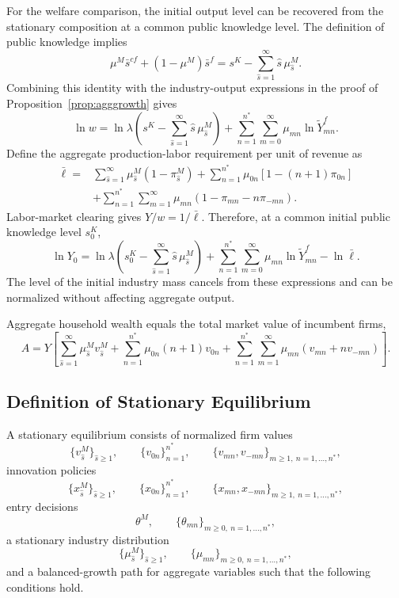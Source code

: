 \documentclass[12pt]{article}
\begin{document}
For the welfare comparison, the initial output level can be recovered from the stationary composition at a common public knowledge level. The definition of public knowledge implies
\[
\mu^M\bar s^{cf}
+
(1-\mu^M)\bar s^f
=
s^K
-
\sum_{\hat s=1}^{\infty}
\hat s\,\mu^M_{\hat s}.
\]
Combining this identity with the industry-output expressions in the proof of Proposition~\ref{prop:agggrowth} gives
\[
\ln w
=
\ln\lambda
\left(
s^K
-
\sum_{\hat s=1}^{\infty}
\hat s\,\mu^M_{\hat s}
\right)
+
\sum_{n=1}^{n^*}
\sum_{m=0}^{\infty}
\mu_{mn}\ln\widetilde Y^f_{mn}.
\]
Define the aggregate production-labor requirement per unit of revenue as
\[
\begin{aligned}
\bar\ell
={}&
\sum_{\hat s=1}^{\infty}
\mu^M_{\hat s}(1-\pi^M_{\hat s})
+
\sum_{n=1}^{n^*}
\mu_{0n}\left[1-(n+1)\pi_{0n}\right]\\
&+
\sum_{n=1}^{n^*}
\sum_{m=1}^{\infty}
\mu_{mn}
\left(1-\pi_{mn}-n\pi_{-mn}\right).
\end{aligned}
\]
Labor-market clearing gives \(Y/w=1/\bar\ell\). Therefore, at a common initial public knowledge level \(s^K_0\),
\[
\ln Y_0
=
\ln\lambda
\left(
s^K_0
-
\sum_{\hat s=1}^{\infty}
\hat s\,\mu^M_{\hat s}
\right)
+
\sum_{n=1}^{n^*}
\sum_{m=0}^{\infty}
\mu_{mn}\ln\widetilde Y^f_{mn}
-
\ln\bar\ell.
\]
The level of the initial industry mass cancels from these expressions and can be normalized without affecting aggregate output.

Aggregate household wealth equals the total market value of incumbent firms,
\begin{equation}
A
=
Y\left[
\sum_{\hat s=1}^{\infty}\mu^M_{\hat s}v^M_{\hat s}
+
\sum_{n=1}^{n^*}\mu_{0n}(n+1)v_{0n}
+
\sum_{n=1}^{n^*}\sum_{m=1}^{\infty}
\mu_{mn}\left(v_{mn}+n v_{-mn}\right)
\right].
\label{eq:asset_app}
\end{equation}

\subsection{Definition of Stationary Equilibrium}\label{app:eqm_definition}

A stationary equilibrium consists of normalized firm values
\[
\{v^M_{\hat s}\}_{\hat s\geq 1},
\qquad
\{v_{0n}\}_{n=1}^{n^*},
\qquad
\{v_{mn},v_{-mn}\}_{m\geq 1,\ n=1,\ldots,n^*},
\]
innovation policies
\[
\{x^M_{\hat s}\}_{\hat s\geq 1},
\qquad
\{x_{0n}\}_{n=1}^{n^*},
\qquad
\{x_{mn},x_{-mn}\}_{m\geq 1,\ n=1,\ldots,n^*},
\]
entry decisions
\[
\theta^M,
\qquad
\{\theta_{mn}\}_{m\geq 0,\ n=1,\ldots,n^*},
\]
a stationary industry distribution
\[
\{\mu^M_{\hat s}\}_{\hat s\geq 1},
\qquad
\{\mu_{mn}\}_{m\geq 0,\ n=1,\ldots,n^*},
\]
and a balanced-growth path for aggregate variables such that the following conditions hold.
\end{document}
